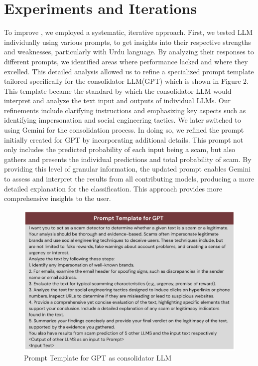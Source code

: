 \documentclass[11pt]{article}
\begin{document}
\section{Experiments and Iterations}

To improve , we employed a systematic, iterative approach. First, we tested LLM individually using various prompts, to get insights into their respective strengths and weaknesses, particularly with Urdu language. By analyzing their responses to different prompts, we identified areas where performance lacked and where they excelled. This detailed analysis allowed us to refine a specialized prompt template tailored specifically for the consolidator LLM(GPT) which is shown in Figure 2. This template became the standard by which the consolidator LLM would interpret and analyze the text input and outputs of individual LLMs. Our refinements include clarifying instructions and emphasizing key aspects such as identifying impersonation and social engineering tactics.
We later switched to using Gemini for the consolidation process. In doing so, we refined the prompt initially created for GPT by incorporating additional details. This prompt not only includes the predicted probability of each input being a scam, but also gathers and presents the individual predictions and total probability of scam. By providing this level of granular information, the updated prompt enables Gemini to assess and interpret the results from all contributing models, producing a more detailed explanation for the classification. This approach provides more comprehensive insights to the user.

\begin{figure}[ht]
    \centering
    \includegraphics[scale=0.5]{prompt.png} 
    \caption{Prompt Template for GPT as consolidator LLM}
    \label{fig:prompt}
\end{figure}
\end{document}
